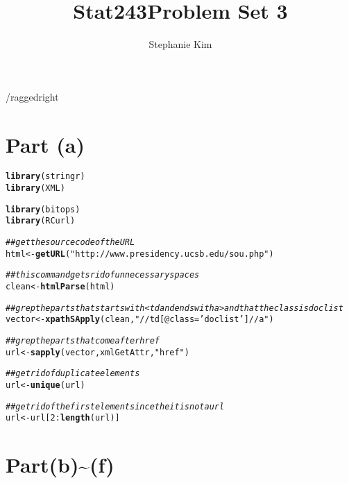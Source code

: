 \documentclass[english]{article}\usepackage[]{graphicx}\usepackage[]{color}
\makeatletter
\newcommand{\hlnum}[1]{\textcolor[rgb]{0.686,0.059,0.569}{#1}}%
\newcommand{\hlstr}[1]{\textcolor[rgb]{0.192,0.494,0.8}{#1}}%
\newcommand{\hlcom}[1]{\textcolor[rgb]{0.678,0.584,0.686}{\textit{#1}}}%
\newcommand{\hlopt}[1]{\textcolor[rgb]{0,0,0}{#1}}%
\newcommand{\hlstd}[1]{\textcolor[rgb]{0.345,0.345,0.345}{#1}}%
\newcommand{\hlkwb}[1]{\textcolor[rgb]{0.69,0.353,0.396}{#1}}%
\newcommand{\hlkwd}[1]{\textcolor[rgb]{0.737,0.353,0.396}{\textbf{#1}}}%
\newenvironment{kframe}{%
 \def\at@end@of@kframe{}%
 \ifinner\ifhmode%
  \def\at@end@of@kframe{\end{minipage}}%
  \begin{minipage}{\columnwidth}%
 \fi\fi%
 \def\FrameCommand##1{\hskip\@totalleftmargin \hskip-\fboxsep
 \colorbox{shadecolor}{##1}\hskip-\fboxsep
     \hskip-\linewidth \hskip-\@totalleftmargin \hskip\columnwidth}%
 \MakeFramed {\advance\hsize-\width
   \@totalleftmargin\z@ \linewidth\hsize
   \@setminipage}}%
 {\par\unskip\endMakeFramed%
 \at@end@of@kframe}
\newenvironment{knitrout}{}{} %
\makeatother
\begin{document}
\title{Stat243}


\title{Problem Set 3}


\author{Stephanie Kim}

\maketitle
/raggedright


\section*{Part (a)}

\begin{knitrout}
\color{fgcolor}\begin{kframe}
\begin{alltt}
\hlkwd{library}\hlstd{(stringr)}
\hlkwd{library}\hlstd{(XML)}
\end{alltt}


{\ttfamily\noindent\itshape\color{messagecolor}{\#\# Loading required package: methods}}\begin{alltt}
\hlkwd{library}\hlstd{(bitops)}
\hlkwd{library}\hlstd{(RCurl)}

\hlcom{## get the source code of the URL}
\hlstd{html}\hlkwb{<-}\hlkwd{getURL}\hlstd{(}\hlstr{"http://www.presidency.ucsb.edu/sou.php"}\hlstd{)}

\hlcom{## this command gets rid of unnecessary spaces }
\hlstd{clean}\hlkwb{<-}\hlkwd{htmlParse}\hlstd{(html)}

\hlcom{## grep the parts that starts with <td and ends with a> and that the class is doclist}
\hlstd{vector}\hlkwb{<-}\hlkwd{xpathSApply}\hlstd{(clean,}\hlstr{"//td[@class='doclist']//a"}\hlstd{)}

\hlcom{## grep the parts that come after href }
\hlstd{url}\hlkwb{<-}\hlkwd{sapply}\hlstd{(vector, xmlGetAttr,}\hlstr{"href"}\hlstd{)}

\hlcom{## get rid of duplicate elements }
\hlstd{url}\hlkwb{<-}\hlkwd{unique}\hlstd{(url)}

\hlcom{## get rid of the first element since the it is not a url }
\hlstd{url}\hlkwb{<-}\hlstd{url[}\hlnum{2}\hlopt{:}\hlkwd{length}\hlstd{(url)]}
\end{alltt}
\end{kframe}
\end{knitrout}


\section*{Part(b)\textasciitilde{}(f)}
\end{document}
